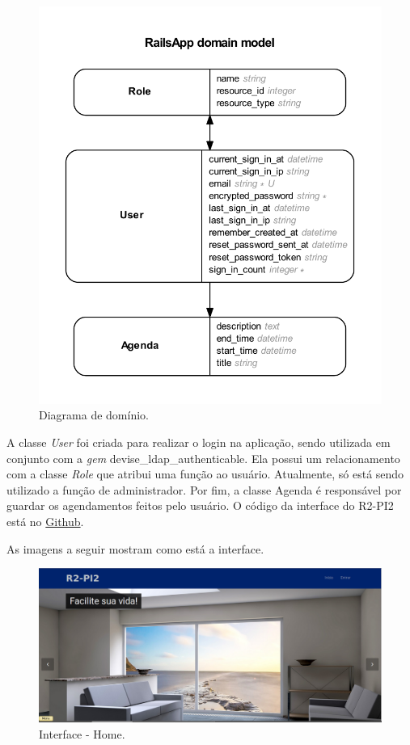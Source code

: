 \begin{figure}[H]
	\centering
	\includegraphics[scale=0.7]{figuras/erd.pdf}
	\caption{Diagrama de domínio.}
	\label{img:diagrama}
\end{figure}

A classe \textit{User} foi criada para realizar o login na aplicação, sendo utilizada em conjunto com a \textit{gem} devise\_ldap\_authenticable. Ela possui um relacionamento com a classe \textit{Role} que atribui uma função ao usuário. Atualmente, só está sendo utilizado a função de administrador. Por fim, a classe Agenda é responsável por guardar os agendamentos feitos pelo usuário. O código da interface do R2-PI2 está no \href{https://github.com/PI2Aspirador/railsApp}{Github}.

As imagens a seguir mostram como está a interface.

\begin{figure}[H]
	\centering
	\includegraphics[scale=0.3]{figuras/home_interface.png}
	\caption{Interface - Home.}
	\label{img:home}
\end{figure}

